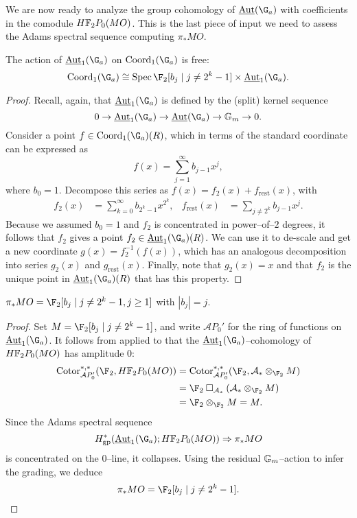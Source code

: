 We are now ready to analyze the group cohomology of $\InternalAut(\G_a)$ with coefficients in the comodule $\HFtwo P_0(MO)$.  This is the last piece of input we need to assess the Adams spectral sequence computing $\pi_* MO$.
\begin{theorem}\label{CalculationOfAutGaActionOnMO}
The action of $\InternalAut_1(\G_a)$ on $\Coord_1(\G_a)$ is free: \[\Coord_1(\G_a) \cong \Spec \F_2[b_j \mid j \ne 2^k - 1] \times \InternalAut_1(\G_a).\]
\end{theorem}
\begin{proof}
Recall, again, that $\InternalAut_1(\G_a)$ is defined by the (split) kernel sequence \[0 \to \InternalAut_1(\G_a) \to \InternalAut(\G_a) \to \Gm \to 0.\]  Consider a point $f \in \Coord_1(\G_a)(R)$, which in terms of the standard coordinate can be expressed as \[f(x) = \sum_{j=1}^\infty b_{j-1} x^j,\] where $b_0 = 1$.  Decompose this series as $f(x) = f_2(x) + f_{\mathrm{rest}}(x)$, with
\begin{align*}
f_2(x) & = \sum_{k=0}^\infty b_{2^k-1} x^{2^k}, &
f_{\mathrm{rest}}(x) & = \sum_{j \ne 2^k} b_{j-1} x^j.
\end{align*}
Because we assumed $b_0 = 1$ and $f_2$ is concentrated in power--of--$2$ degrees, it follows that $f_2$ gives a point $f_2 \in \InternalAut_1(\G_a)(R)$.  We can use it to de-scale and get a new coordinate $g(x) = f_2^{-1}(f(x))$, which has an analogous decomposition into series $g_2(x)$ and $g_{\mathrm{rest}}(x)$.  Finally, note that $g_2(x) = x$ and that $f_2$ is the unique point in $\InternalAut_1(\G_a)(R)$ that has this property.
\end{proof}

\begin{corollary}\label{CalculationOfPiStarMO}
$\pi_* MO = \F_2[b_j \mid j \ne 2^k - 1, j \ge 1]$ with $|b_j| = j$.
\end{corollary}
\begin{proof}
Set $M = \F_2[b_j \mid j \ne 2^k - 1]$, and write $\mathcal AP_0'$ for the ring of functions on $\InternalAut_1(\G_a)$.  It follows from  applied to  that the $\InternalAut_1(\G_a)$--cohomology of $\HFtwo P_0(MO)$ has amplitude $0$:
\begin{align*}
\Cotor_{\mathcal AP_0'}^{*, *}(\F_2, \HFtwo P_0(MO)) & = \Cotor_{\mathcal AP_0'}^{*, *}(\F_2, \mathcal A_* \otimes_{\F_2} M) \\
& = \F_2 \cotensor_{\mathcal A_*} (\mathcal A_* \otimes_{\F_2} M) \\
& = \F_2 \otimes_{\F_2} M = M.
\end{align*}
Since the Adams spectral sequence \[H^*_{\mathrm{gp}}(\InternalAut_1(\G_a); \HFtwo P_0(MO)) \Rightarrow \pi_* MO\] is concentrated on the $0$--line, it collapses.  Using the residual $\mathbb G_m$--action to infer the grading, we deduce \[\pi_* MO = \F_2[b_j \mid j \ne 2^k-1]. \qedhere\]
\end{proof}

